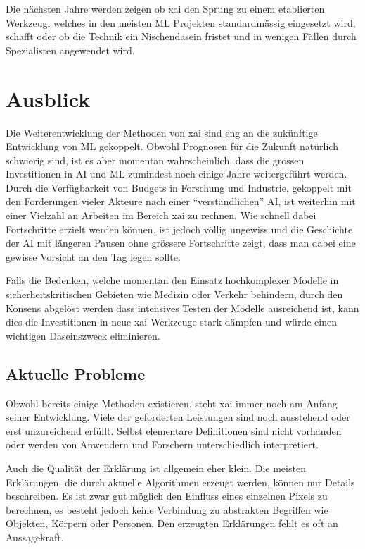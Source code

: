 \documentclass[
  12pt, %
  a4paper, %
  oneside, %
  openany, 
  numbers=noenddot, %
  BCOR=5mm, %
  parskip=half*, %
  thesis, %
]{bfhbook}
\begin{document}
Die nächsten Jahre werden zeigen ob \Gls{xai} den Sprung zu einem etablierten Werkzeug, welches in den meisten \Gls{ML} Projekten standardmässig eingesetzt wird, schafft oder ob die Technik ein Nischendasein fristet und in wenigen Fällen durch Spezialisten angewendet wird.

\chapter{Ausblick}
Die Weiterentwicklung der Methoden von \Gls{xai} sind eng an die zukünftige Entwicklung von \Gls{ML} gekoppelt. Obwohl Prognosen für die Zukunft natürlich schwierig sind, ist es aber momentan wahrscheinlich, dass die grossen Investitionen in \Gls{AI} und \Gls{ML} zumindest noch einige Jahre weitergeführt werden. Durch die Verfügbarkeit von Budgets in Forschung und Industrie, gekoppelt mit den Forderungen vieler Akteure nach einer ``verständlichen'' \Gls{AI}, ist weiterhin mit einer Vielzahl an Arbeiten im Bereich \Gls{xai} zu rechnen. Wie schnell dabei Fortschritte erzielt werden können, ist jedoch völlig ungewiss und die Geschichte der \Gls{AI} mit längeren Pausen ohne grössere Fortschritte zeigt, dass man dabei eine gewisse Vorsicht an den Tag legen sollte.

Falls die Bedenken, welche momentan den Einsatz hochkomplexer Modelle in sicherheitskritischen Gebieten wie Medizin oder Verkehr behindern, durch den Konsens abgelöst werden dass intensives Testen der Modelle ausreichend ist, kann dies die Investitionen in neue \Gls{xai} Werkzeuge stark dämpfen und würde einen wichtigen Daseinszweck eliminieren.

\section{Aktuelle Probleme}
Obwohl bereits einige Methoden existieren, steht \Gls{xai} immer noch am Anfang seiner Entwicklung. Viele der geforderten Leistungen  sind noch ausstehend oder erst unzureichend erfüllt. Selbst elementare Definitionen sind nicht vorhanden oder werden von Anwendern und Forschern unterschiedlich interpretiert.  

Auch die Qualität der Erklärung ist allgemein eher klein. Die meisten Erklärungen, die durch aktuelle Algorithmen erzeugt werden, können nur Details beschreiben. Es ist zwar gut möglich den Einfluss eines einzelnen Pixels zu berechnen, es besteht jedoch keine Verbindung zu abstrakten Begriffen wie Objekten, Körpern oder Personen. Den erzeugten Erklärungen fehlt es oft an Aussagekraft.
\end{document}
